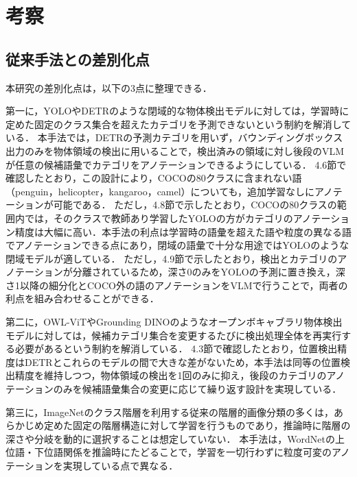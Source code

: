 \section{考察}
\subsection{従来手法との差別化点}
本研究の差別化点は，以下の3点に整理できる．

第一に，YOLO\cite{ref_YOLO}やDETR\cite{ref_DETR}のような閉域的な物体検出モデルに対しては，学習時に定めた固定のクラス集合を超えたカテゴリを予測できないという制約を解消している．
本手法では，DETRの予測カテゴリを用いず，バウンディングボックス出力のみを物体領域の検出に用いることで，検出済みの領域に対し後段のVLMが任意の候補語彙でカテゴリをアノテーションできるようにしている．
4.6節で確認したとおり，この設計により，COCOの80クラスに含まれない語（penguin，helicopter，kangaroo，camel）についても，追加学習なしにアノテーションが可能である．
ただし，4.8節で示したとおり，COCOの80クラスの範囲内では，そのクラスで教師あり学習したYOLOの方がカテゴリのアノテーション精度は大幅に高い．本手法の利点は学習時の語彙を超えた語や粒度の異なる語でアノテーションできる点にあり，閉域の語彙で十分な用途ではYOLOのような閉域モデルが適している．
ただし，4.9節で示したとおり，検出とカテゴリのアノテーションが分離されているため，深さ0のみをYOLOの予測に置き換え，深さ1以降の細分化とCOCO外の語のアノテーションをVLMで行うことで，両者の利点を組み合わせることができる．

第二に，OWL-ViT\cite{ref_OWLViT}やGrounding DINO\cite{ref_GDINO}のようなオープンボキャブラリ物体検出モデルに対しては，候補カテゴリ集合を変更するたびに検出処理全体を再実行する必要があるという制約を解消している．
4.3節で確認したとおり，位置検出精度はDETRとこれらのモデルの間で大きな差がないため，本手法は同等の位置検出精度を維持しつつ，物体領域の検出を1回のみに抑え，後段のカテゴリのアノテーションのみを候補語彙集合の変更に応じて繰り返す設計を実現している．

第三に，ImageNetのクラス階層を利用する従来の階層的画像分類の多くは，あらかじめ定めた固定の階層構造に対して学習を行うものであり，推論時に階層の深さや分岐を動的に選択することは想定していない．
本手法は，WordNetの上位語・下位語関係を推論時にたどることで，学習を一切行わずに粒度可変のアノテーションを実現している点で異なる．

